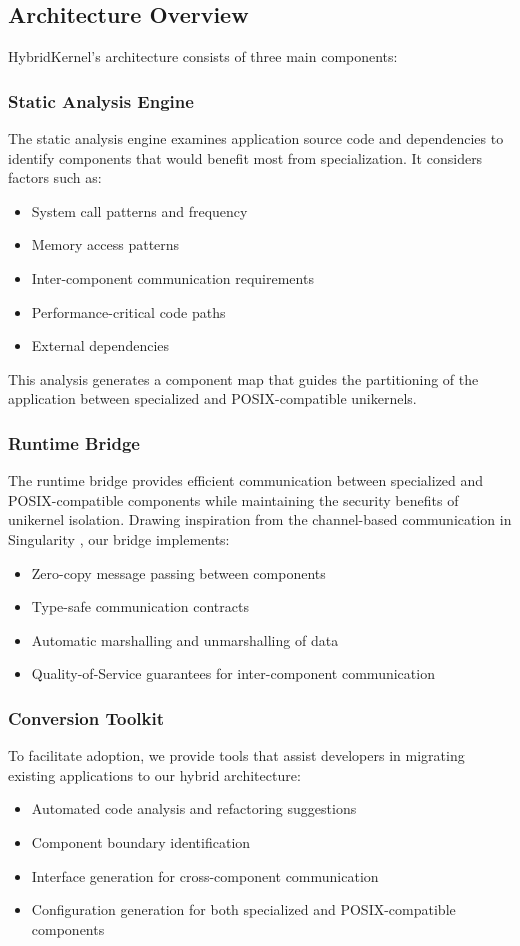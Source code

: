 \documentclass[conference]{IEEEtran}
\begin{document}
\subsection{Architecture Overview}
HybridKernel's architecture consists of three main components:

\subsubsection{Static Analysis Engine}
The static analysis engine examines application source code and dependencies to identify components that would benefit most from specialization. It considers factors such as:
\begin{itemize}
	\item System call patterns and frequency
	\item Memory access patterns
	\item Inter-component communication requirements
	\item Performance-critical code paths
	\item External dependencies
\end{itemize}

This analysis generates a component map that guides the partitioning of the application between specialized and POSIX-compatible unikernels.

\subsubsection{Runtime Bridge}
The runtime bridge provides efficient communication between specialized and POSIX-compatible components while maintaining the security benefits of unikernel isolation. Drawing inspiration from the channel-based communication in Singularity \cite{singularity}, our bridge implements:
\begin{itemize}
	\item Zero-copy message passing between components
	\item Type-safe communication contracts
	\item Automatic marshalling and unmarshalling of data
	\item Quality-of-Service guarantees for inter-component communication
\end{itemize}

\subsubsection{Conversion Toolkit}
To facilitate adoption, we provide tools that assist developers in migrating existing applications to our hybrid architecture:
\begin{itemize}
	\item Automated code analysis and refactoring suggestions
	\item Component boundary identification
	\item Interface generation for cross-component communication
	\item Configuration generation for both specialized and POSIX-compatible components
\end{itemize}
\end{document}
